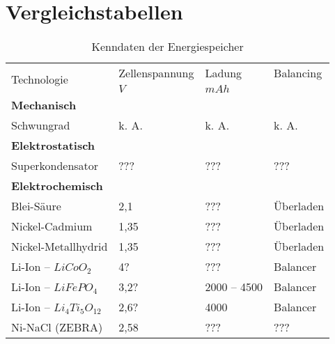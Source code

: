 \section{Vergleichstabellen}
\label{vergleichstabellen_speichertechnologien}
\begin{table}\centering
	\begin{tabularx}{\linewidth}{lXXX}
		\toprule
		\multirow{2}{*}{Technologie} & Zellenspannung           & Ladung       & Balancing \\
		                             & $V$                      & $mAh$        & $ $       \\ \midrule
		\textbf{Mechanisch}          &                          &              &  \\
		Schwungrad                   & k. A.                    & k. A.        & k. A.     \\
		\textbf{Elektrostatisch}     &                          &              &  \\
		Superkondensator             & ???                      & ???          & ???       \\
		\textbf{Elektrochemisch}     &                          &              &  \\
		Blei-Säure                   & 2,1 \cite{Sterner:2014}  & ???          & Überladen \\
		Nickel-Cadmium               & 1,35 \cite{Sterner:2014} & ???          & Überladen \\
		Nickel-Metallhydrid          & 1,35 \cite{Sterner:2014} & ???          & Überladen \\
		Li-Ion -- $LiCoO_2$          & 4? \cite{Sterner:2014}   & ???          & Balancer  \\
		Li-Ion -- $LiFePO_4$         & 3,2? \cite{Sterner:2014} & 2000 -- 4500 & Balancer  \\
		Li-Ion -- $Li_4Ti_5O_{12}$   & 2,6? \cite{Sterner:2014} & 4000         & Balancer  \\
		Ni-NaCl (ZEBRA)              & 2,58 \cite{Sterner:2014} & ???          & ???       \\ \bottomrule
	\end{tabularx}
	\caption{Kenndaten der Energiespeicher}
\end{table}


